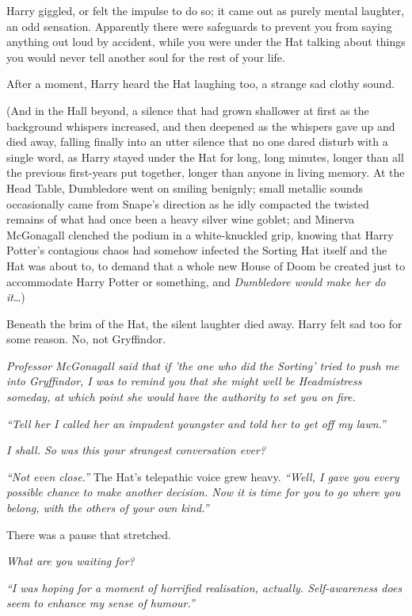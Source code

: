 Harry giggled, or felt the impulse to do so; it came out as purely
mental laughter, an odd sensation. Apparently there were safeguards to
prevent you from saying anything out loud by accident, while you were
under the Hat talking about things you would never tell another soul for
the rest of your life.

After a moment, Harry heard the Hat laughing too, a strange sad clothy
sound.

(And in the Hall beyond, a silence that had grown shallower at first as
the background whispers increased, and then deepened as the whispers
gave up and died away, falling finally into an utter silence that no one
dared disturb with a single word, as Harry stayed under the Hat for
long, long minutes, longer than all the previous first-years put
together, longer than anyone in living memory. At the Head Table,
Dumbledore went on smiling benignly; small metallic sounds occasionally
came from Snape's direction as he idly compacted the twisted remains of
what had once been a heavy silver wine goblet; and Minerva McGonagall
clenched the podium in a white-knuckled grip, knowing that Harry
Potter's contagious chaos had somehow infected the Sorting Hat itself
and the Hat was about to, to demand that a whole new House of Doom be
created just to accommodate Harry Potter or something, and
\emph{Dumbledore would make her do it}\ldots{})

Beneath the brim of the Hat, the silent laughter died away. Harry felt
sad too for some reason. No, not Gryffindor.

\emph{Professor McGonagall said that if 'the one who did the Sorting'
tried to push me into Gryffindor, I was to remind you that she might
well be Headmistress someday, at which point she would have the
authority to set you on fire.}

\emph{``Tell her I called her an impudent youngster and told her to get
off my lawn.''}

\emph{I shall. So was this your strangest conversation ever?}

\emph{``Not even close.''} The Hat's telepathic voice grew heavy.
\emph{``Well, I gave you every possible chance to make another decision.
Now it is time for you to go where you belong, with the others of your
own kind.''}

There was a pause that stretched.

\emph{What are you waiting for?}

\emph{``I was hoping for a moment of horrified realisation, actually.
Self-awareness does seem to enhance my sense of humour.''}

